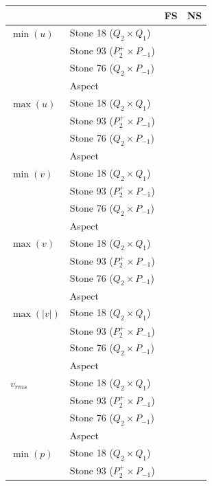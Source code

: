 \begin{center}
\begin{tabular}{llp{4cm}p{4cm}}
\hline
            &  & FS & NS \\ 
\hline\hline
$\min(u)$   & Stone 18 ($Q_2\times Q_1$) &  &    \\ 
            & Stone 93 ($P_2^+\times P_{-1}$) &  &   \\
            & Stone 76 ($Q_2\times P_{-1}$) & & \\
            & Aspect   &  &         \\
\hline
$\max(u)$   & Stone 18 ($Q_2\times Q_1$) &  &    \\ 
            & Stone 93 ($P_2^+\times P_{-1}$)&  &         \\
            & Stone 76 ($Q_2\times P_{-1}$) & & \\
            & Aspect   &  &         \\
\hline
$\min(v)$   & Stone 18 ($Q_2\times Q_1$) &  &    \\ 
            & Stone 93 ($P_2^+\times P_{-1}$)&  &         \\
            & Stone 76 ($Q_2\times P_{-1}$) & & \\
            & Aspect   &           \\
\hline
$\max(v)$   & Stone 18 ($Q_2\times Q_1$) &  &    \\ 
            & Stone 93 ($P_2^+\times P_{-1}$)&  &         \\
            & Stone 76 ($Q_2\times P_{-1}$) & & \\
            & Aspect   &   &        \\
\hline
$\max(|v|)$ & Stone 18 ($Q_2\times Q_1$) &  &    \\ 
            & Stone 93 ($P_2^+\times P_{-1}$)&  &         \\
            & Stone 76 ($Q_2\times P_{-1}$) & & \\
            & Aspect   &   &        \\
\hline
$v_{rms}$   & Stone 18 ($Q_2\times Q_1$) &  &    \\ 
            & Stone 93 ($P_2^+\times P_{-1}$)&  &         \\
            & Stone 76 ($Q_2\times P_{-1}$) & & \\
            & Aspect   &          \\
\hline
$\min(p)$   & Stone 18 ($Q_2\times Q_1$) &  &    \\ 
            & Stone 93 ($P_2^+\times P_{-1}$)&  &         \\

\end{tabular}
\end{center}
